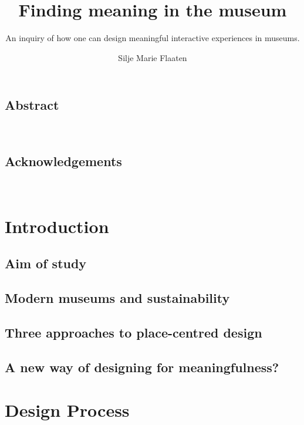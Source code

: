 \documentclass[UKenglish, a4paper]{ifimaster}
\title{Finding meaning in the museum}
\subtitle{An inquiry of how one can design meaningful interactive experiences in museums.}
\author{Silje Marie Flaaten}
\begin{document}
\duoforside[dept={Department of Informatics}, program={Informatics: design, use, interaction},long]
\frontmatter{}

\chapter*{Abstract}


\newpage
\ %
\newpage

\chapter*{Acknowledgements}


\newpage
\ %
\newpage

\tableofcontents{}
\listoffigures{}
\listoftables{}

\mainmatter{}

\part{Introduction}

\chapter{ Aim of study}


\chapter{ Modern museums and sustainability}


\chapter{ Three approaches to place-centred design}


\chapter{ A new way of designing for meaningfulness?}



\part{Design Process}
\end{document}
